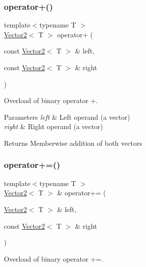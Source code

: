 \subsubsection{\texorpdfstring{operator+()}{operator+()}}
{\footnotesize\ttfamily template$<$typename T $>$ \\
\hyperlink{classsf_1_1_vector2}{Vector2}$<$ T $>$ operator+ (\begin{DoxyParamCaption}\item[{const \hyperlink{classsf_1_1_vector2}{Vector2}$<$ T $>$ \&}]{left,  }\item[{const \hyperlink{classsf_1_1_vector2}{Vector2}$<$ T $>$ \&}]{right }\end{DoxyParamCaption})\hspace{0.3cm}{\ttfamily [related]}}



Overload of binary operator +. 


\begin{DoxyParams}{Parameters}
{\em left} & Left operand (a vector) \\
\hline
{\em right} & Right operand (a vector)\\
\hline
\end{DoxyParams}
\begin{DoxyReturn}{Returns}
Memberwise addition of both vectors 
\end{DoxyReturn}
\mbox{\label{classsf_1_1_vector2_ad4b7a9d355d57790bfc7df0ade8bb628}} 
\subsubsection{\texorpdfstring{operator+=()}{operator+=()}}
{\footnotesize\ttfamily template$<$typename T $>$ \\
\hyperlink{classsf_1_1_vector2}{Vector2}$<$ T $>$ \& operator+= (\begin{DoxyParamCaption}\item[{\hyperlink{classsf_1_1_vector2}{Vector2}$<$ T $>$ \&}]{left,  }\item[{const \hyperlink{classsf_1_1_vector2}{Vector2}$<$ T $>$ \&}]{right }\end{DoxyParamCaption})\hspace{0.3cm}{\ttfamily [related]}}



Overload of binary operator +=. 

